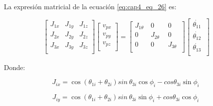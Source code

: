         La expresión matricial de la ecuación \ref{eq:cap4_eq_26} es:
        
        \begin{equation}
                \left[ \begin{matrix}
                J_{1x}  &  J_{1y}  &  J_{1z}\\
                J_{2x}  &  J_{2y}  &  J_{2z}\\
                J_{3x}  &  J_{3y}  &  J_{3z}\\
                \end{matrix}
                 \right]  \left[ \begin{matrix}
                v_{px}\\
                v_{py}\\
                v_{pz}\\
                \end{matrix}
                 \right] = \left[ \begin{matrix}
                J_{1 \theta }~  &  0  &  0\\
                0  &  J_{2 \theta }~~  &  0\\
                0  &  0  &  J_{3 \theta }~\\
                \end{matrix}
                 \right]  \left[ \begin{matrix}
                \dot{ \theta _{11}}~\\
                \dot{ \theta _{12}}\\
                \dot{ \theta _{13}}~\\
                \end{matrix}
                 \right]
                \label{eq:cap4_eq_27}
        \end{equation}
        
    Donde: 
             \vspace{-1em}

    \begin{equation}
        J_{ix}=\cos  \left(  \theta _{1i}+ \theta _{2i} \right) sin~ \theta _{3i}\cos  \phi _{i}-cos  \theta _{3i}\sin  \phi _{i}~
        \label{eq:cap4_eq_28}
    \end{equation}
    \vspace{-3.5em}

    \begin{equation}
        J_{iy}=\cos  \left(  \theta _{1i}+ \theta _{2i} \right) sin~ \theta _{3i}\sin  \phi _{i}+ cos  \theta _{3i}\cos  \phi _{i}~ 
        \label{eq:cap4_eq_29}
    \end{equation}
    \vspace{-3.5em}

